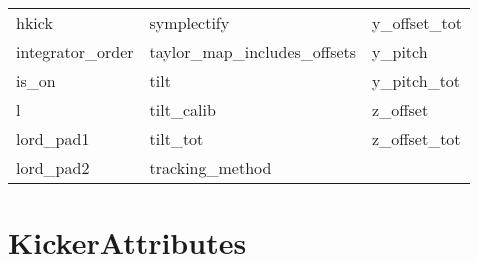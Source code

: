 \begin{tabular}{lll}
hkick                       & symplectify                 & y_offset_tot                \\
integrator_order            & taylor_map_includes_offsets & y_pitch                     \\
is_on                       & tilt                        & y_pitch_tot                 \\
l                           & tilt_calib                  & z_offset                    \\
lord_pad1                   & tilt_tot                    & z_offset_tot                \\
lord_pad2                   & tracking_method             &                             \\
 \bottomrule
 \end{tabular}
 \vfill
 
 \section{KickerAttributes}
 \label{s:list.kicker}
 

